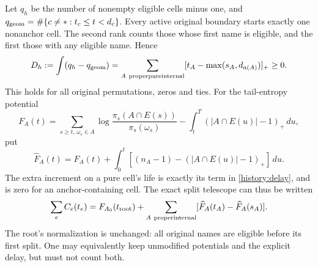 Let $q_h$ be the number of nonempty eligible cells minus one, and
$q_{\rm geom}=\#\{c\ne *:t_c\le t<d_c\}$. Every active original
boundary starts exactly one nonanchor cell. The second rank counts
those whose first name is eligible, and the first those with any
eligible name. Hence
\begin{equation}
 D_h:=\int(q_h-q_{\rm geom})
 =\sum_{A\ {\rm proper pure internal}}
        [t_A-\max(s_A,d_{a(A)})]_+\ge0.
 \label{history:delay}
\end{equation}
This holds for all original permutations, zeros and ties.
For the tail-entropy potential
\[
 F_A(t)=\sum_{s\ge t,\,\omega_s\in A}
       \log\frac{\pi_s(A\cap E(s))}{\pi_s(\omega_s)}
       -\int_t^T(|A\cap E(u)|-1)_+\,du,
\]
put
\[
 \widehat F_A(t)=F_A(t)+\int_0^t
       [(n_A-1)-(|A\cap E(u)|-1)_+]\,du.
\]
The extra increment on a pure cell's life is exactly its term in
\eqref{history:delay}, and is zero for an anchor-containing cell.
The exact split telescope can thus be written
\begin{equation}
 \sum_eC_e(t_e)=F_{A_0}(t_{\rm root})
     +\sum_{A\ {\rm proper internal}}
             [\widehat F_A(t_A)-\widehat F_A(s_A)].
 \label{history:lifetime-telescope}
\end{equation}
The root's normalization is unchanged: all original names are eligible
before its first split. One may equivalently keep unmodified potentials
and the explicit delay, but must not count both.

